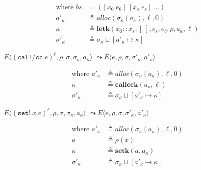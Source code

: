 \documentclass[12pt,draft]{article}
\newcommand{\callccsyn}[1]{(\texttt{call/cc}\;#1)}
\newcommand{\setsyn}[2]{(\texttt{set!}\;#1\;#2)}
\begin{document}
{\begin{multicols*}{2}
\begin{align*}
  \text{where }
  bs &= ([x_0\;e_0]\;[x_s\;e_s]\;...) \\
  a'_\kappa &\triangleq alloc(\sigma_\kappa(a_\kappa), \ell, 0) \\
  \kappa &\triangleq \textbf{letk}(x_0::x_s, [\;], e_s, e_b, \rho, a_\kappa, \ell) \\
  \sigma'_\kappa &\triangleq \sigma_\kappa \sqcup [a'_\kappa \mapsto \kappa]
\end{align*}
\begin{center}
  $E\langle \callccsyn{e}^\ell , \rho , \sigma , \sigma_\kappa , a_\kappa \rangle$
  $\leadsto E\langle e , \rho , \sigma , \sigma'_\kappa , a'_\kappa \rangle$
\end{center}
\vspace{-5mm}
\begin{align*}
  \text{where }
  a'_\kappa &\triangleq alloc(\sigma_\kappa(a_\kappa), \ell, 0) \\
  \kappa &\triangleq \textbf{callcck}(a_\kappa, \ell) \\
  \sigma'_\kappa &\triangleq \sigma_\kappa \sqcup [a'_\kappa \mapsto \kappa]
\end{align*}
\begin{center}
  $E\langle \setsyn{x}{e}^\ell , \rho , \sigma , \sigma_\kappa , a_\kappa \rangle$
  $\leadsto E\langle e , \rho , \sigma , \sigma'_\kappa , a'_\kappa \rangle$
\end{center}
\vspace{-5mm}
\begin{align*}
  \text{where }
  a'_\kappa &\triangleq alloc(\sigma_\kappa(a_\kappa), \ell, 0) \\
  a &\triangleq \rho(x) \\
  \kappa &\triangleq \textbf{setk}(a, a_\kappa) \\
  \sigma'_\kappa &\triangleq \sigma_\kappa \sqcup [a'_\kappa \mapsto \kappa]
\end{align*}


\vfill\null
\columnbreak


\end{multicols*}}
\end{document}

